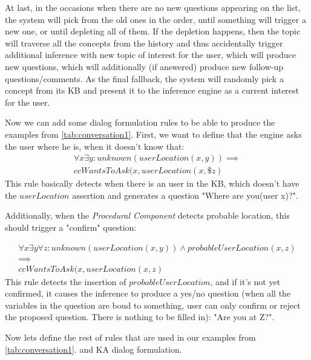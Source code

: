 At last, in the occasions when there are no new questions appearing on the list,
the system will pick from the old ones in the order, until something will 
trigger a new one, or until depleting all of them. If the depletion happens, 
then the topic will traverse all the concepts from the history and thus 
accidentally trigger additional inference with new topic of interest for the 
user, which will produce new questions, which will additionally (if answered) 
produce new follow-up questions/comments. As the final fallback, the system 
will randomly pick a concept from its KB and present it to the inference 
engine as a current interest for the user.

Now we can add some dialog formulation rules to be able to produce the
examples from \autoref{tab:conversation1}. First, we want to define that
the engine asks the user where he is, when it doesn't know that:
\begin{equation}\label{rule:userLoc}
\begin{gathered}
	\forall x \exists y:unknown(userLocation(x,y)) \implies \\
	ccWantsToAsk(x,userLocation(x,\$z)
\end{gathered}
\end{equation}
This rule basically detects when there is an user in the KB, which doesn't have
the $userLocation$ assertion and generates a question "Where are you(user x)?".

Additionally, when the \emph{Procedural Component} detects probable location,
this should trigger a "confirm" question:

\begin{equation}\label{rule:userLocConfirm}
\begin{gathered}
	\forall x \exists y \forall z:unknown(userLocation(x,y)) \land 
    probableUserLocation(x,z) 
    \\ \implies \\
	ccWantsToAsk(x,userLocation(x,z)
\end{gathered}
\end{equation}
This rule detects the insertion of $probableUserLocation$, and if it's not
yet confirmed, it causes the inference to produce a yes/no question (when
all the variables in the question are boud to something, user can only confirm
or reject the proposed question. There is nothing to be filled in):
"Are you at Z?".

Now lets define the rest of rules that are used in our examples 
from \autoref{tab:conversation1}. and KA dialog formulation.

